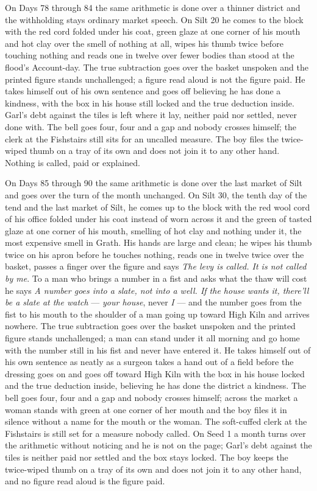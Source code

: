 \documentclass{design/chronicle}
\begin{document}
{On Days 78 through 84 the same arithmetic is done over a thinner district and the withholding stays ordinary market speech. On Silt 20 he comes to the block with the red cord folded under his coat, green glaze at one corner of his mouth and hot clay over the smell of nothing at all, wipes his thumb twice before touching nothing and reads one in twelve over fewer bodies than stood at the flood’s Account-day. The true subtraction goes over the basket unspoken and the printed figure stands unchallenged; a figure read aloud is not the figure paid. He takes himself out of his own sentence and goes off believing he has done a kindness, with the box in his house still locked and the true deduction inside. Garl’s debt against the tiles is left where it lay, neither paid nor settled, never done with. The bell goes four, four and a gap and nobody crosses himself; the clerk at the Fishstairs still sits for an uncalled measure. The boy files the twice-wiped thumb on a tray of its own and does not join it to any other hand. Nothing is called, paid or explained.

On Days 85 through 90 the same arithmetic is done over the last market of Silt and goes over the turn of the month unchanged. On Silt 30, the tenth day of the tend and the last market of Silt, he comes up to the block with the red wool cord of his office folded under his coat instead of worn across it and the green of tasted glaze at one corner of his mouth, smelling of hot clay and nothing under it, the most expensive smell in Grath. His hands are large and clean; he wipes his thumb twice on his apron before he touches nothing, reads one in twelve twice over the basket, passes a finger over the figure and says \emph{The levy is called. It is not called by me}. To a man who brings a number in a fist and asks what the thaw will cost he says \emph{A number goes into a slate, not into a well. If the house wants it, there’ll be a slate at the watch} --- \emph{your house}, never \emph{I} --- and the number goes from the fist to his mouth to the shoulder of a man going up toward High Kiln and arrives nowhere. The true subtraction goes over the basket unspoken and the printed figure stands unchallenged; a man can stand under it all morning and go home with the number still in his fist and never have entered it. He takes himself out of his own sentence as neatly as a surgeon takes a hand out of a field before the dressing goes on and goes off toward High Kiln with the box in his house locked and the true deduction inside, believing he has done the district a kindness. The bell goes four, four and a gap and nobody crosses himself; across the market a woman stands with green at one corner of her mouth and the boy files it in silence without a name for the mouth or the woman. The soft-cuffed clerk at the Fishstairs is still set for a measure nobody called. On Seed 1 a month turns over the arithmetic without noticing and he is not on the page; Garl’s debt against the tiles is neither paid nor settled and the box stays locked. The boy keeps the twice-wiped thumb on a tray of its own and does not join it to any other hand, and no figure read aloud is the figure paid.

}
\end{document}
